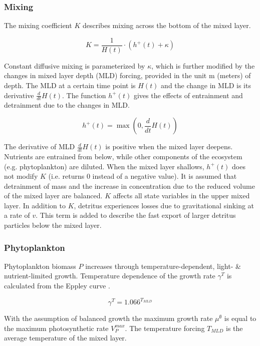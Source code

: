 \documentclass[template.tex]{subfiles}
\begin{document}
\subsubsection{Mixing}

The mixing coefficient $K$ describes mixing across the bottom of the mixed layer.

\begin{equation}
    K = \frac{1}{H(t)} \cdot \left(h^{+}(t) + \kappa\right)
\end{equation}

Constant diffusive mixing is parameterized by $\kappa$, which is further modified by the changes in mixed layer depth (MLD) forcing, provided in the unit \unit{m} (meters) of depth. The MLD at a certain time point is $H(t)$ and the change in MLD is its derivative $\frac{d}{d t} H(t)$. The function $h^{+}(t)$ gives the effects of entrainment and detrainment due to the changes in MLD.

\begin{equation}
    h^{+}(t) = \max\left(0, \frac{d}{d t} H(t)\right)
\end{equation}

The derivative of MLD $\frac{d}{d t} H(t)$ is positive when the mixed layer deepens. Nutrients are entrained from below, while other components of the ecosystem (e.g. phytoplankton) are diluted. When the mixed layer shallows, $h^{+}(t)$ does not modify $K$ (i.e. returns 0 instead of a negative value). It is assumed that detrainment of mass and the increase in concentration due to the reduced volume of the mixed layer are balanced.
$K$ affects all state variables in the upper mixed layer. In addition to $K$, detritus experiences losses due to gravitational sinking at a rate of $v$. This term is added to describe the fast export of larger detritus particles below the mixed layer. 

\subsubsection{Phytoplankton}
Phytoplankton biomass $P$ increases through temperature-dependent, light- \& nutrient-limited growth. Temperature dependence of the  growth rate $\gamma^{T}$ is calculated from the Eppley curve \citep{Eppley1972TemperatureSea}.

\begin{equation}
    \gamma^{T} = 1.066^{T_{MLD}} \label{mumax}
\end{equation}

With the assumption of balanced growth the maximum growth rate $\mu^{\emptyset}$ is equal to the maximum photosynthetic rate $V^{max}_P$. The temperature forcing $T_{MLD}$ is the average temperature of the mixed layer.
\end{document}
